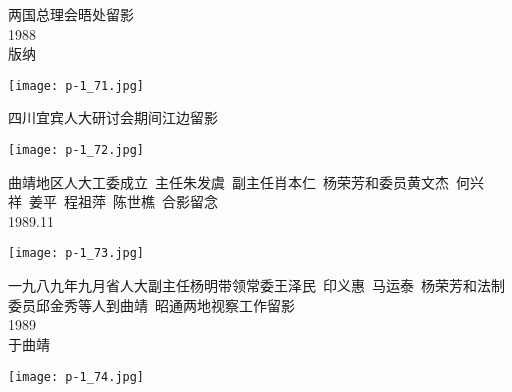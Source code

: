 \begin{tcolorbox}[notitle,grow to right by=1in,boxrule=0pt,colback=DarkRed,colframe=DarkRed]
    \fontsize{1cm}{0.9cm}\selectfont
    \raggedleft
    \noindent
    两国总理会晤处留影\\
    \Large
    1988\\
    版纳
\end{tcolorbox}
\begin{center}
    \texttt{[image: p-1\_71.jpg]}
\end{center}
\clearpage


\begin{tcolorbox}[notitle,grow to right by=1in,boxrule=0pt,colback=DarkRed,colframe=DarkRed]
    \fontsize{1cm}{0.9cm}\selectfont
    \raggedleft
    \noindent
    四川宜宾人大研讨会期间江边留影\\
    \Large

    
\end{tcolorbox}
\begin{center}
    \texttt{[image: p-1\_72.jpg]}
\end{center}
\clearpage


\begin{tcolorbox}[notitle,grow to right by=1in,boxrule=0pt,colback=DarkRed,colframe=DarkRed]
    \fontsize{1cm}{0.9cm}\selectfont
    \raggedleft
    \noindent
    曲靖地区人大工委成立~主任朱发虞~副主任肖本仁~杨荣芳和委员黄文杰~何兴祥~姜平~程祖萍~陈世樵~合影留念\\
    \Large
    1989.11\\
    
\end{tcolorbox}
\begin{center}
    \texttt{[image: p-1\_73.jpg]}
\end{center}
\clearpage


\begin{tcolorbox}[notitle,grow to right by=1in,boxrule=0pt,colback=DarkRed,colframe=DarkRed]
    \fontsize{1cm}{0.9cm}\selectfont
    \raggedleft
    \noindent
    一九八九年九月省人大副主任杨明带领常委王泽民~印义惠~马运泰~杨荣芳和法制委员邱金秀等人到曲靖~昭通两地视察工作留影\\
    \Large
    1989\\
    于曲靖
\end{tcolorbox}
\begin{center}
    \texttt{[image: p-1\_74.jpg]}
\end{center}
\clearpage


